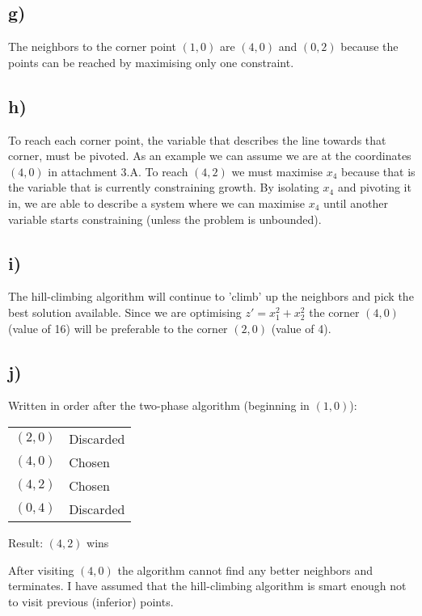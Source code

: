\documentclass[12pt,a4paper]{article}
\begin{document}
\subsection*{g)}
The neighbors to the corner point $(1, 0)$ are $(4, 0)$ and $(0, 2)$ because
the points can be reached by maximising only one constraint.

\subsection*{h)}
To reach each corner point, the variable that describes the line towards that
corner, must be pivoted. As an example we can assume we are at the coordinates
$(4, 0)$ in attachment 3.A. To reach $(4, 2)$ we must maximise $x_4$ because
that is the variable that is currently constraining growth. By isolating $x_4$
and pivoting it in, we are able to describe a system where we can maximise $x_4$
until another variable starts constraining (unless the problem is unbounded).

\subsection*{i)}
The hill-climbing algorithm will continue to 'climb' up the neighbors and pick
the best solution available. Since we are optimising $z' = x_1^2 + x_2^2$
the corner $(4, 0)$ (value of 16) will be preferable to the corner $(2, 0)$
(value of 4).

\subsection*{j)}
Written in order after the two-phase algorithm (beginning in $(1, 0)$):

\begin{tabular}{l l}
$(2, 0)$ & Discarded\\
$(4, 0)$ & Chosen \\
$(4, 2)$ & Chosen \\
$(0, 4)$ & Discarded \\
\end{tabular}

Result: $(4, 2)$ wins

After visiting $(4, 0)$ the algorithm cannot find any better neighbors and
terminates. I have assumed that the hill-climbing algorithm is smart enough not to visit
previous (inferior) points.
\end{document}
